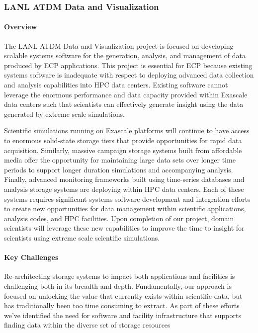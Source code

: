 \subsubsection{ LANL ATDM Data and Visualization} 

\paragraph{Overview} 
The LANL ATDM Data and Visualization project is focused on developing scalable
systems software for the generation, analysis, and management of data
produced by ECP applications. This project is essential for ECP because
existing systems software is inadequate with respect to deploying advanced
data collection and analysis capabilities into HPC data centers. Existing
software cannot leverage the enormous performance and data capacity
provided within Exascale data centers such that scientists can effectively
generate insight using the data generated by extreme scale
simulations.

Scientific simulations running on Exascale platforms will
continue to have access to enormous solid-state storage tiers that provide 
opportunities for rapid data acquisition. Similarly, massive campaign storage
systems built from affordable media offer the opportunity for maintaining
large data sets over longer time periods to support longer duration
simulations and accompanying analysis. Finally, advanced monitoring frameworks
built using time-series databases and analysis storage systems are deploying
within HPC data centers. Each of these systems requires significant systems
software development and integration efforts to create new opportunities for data
management within scientific applications, analysis codes, and HPC
facilities. Upon completion of our project, domain scientists will
leverage these new capabilities to improve the
time to insight for scientists using extreme scale scientific simulations.

\paragraph{Key  Challenges}
Re-architecting storage systems to impact both applications and facilities is
challenging both in its breadth and depth. Fundamentally, our approach is
focused on unlocking the value that currently exists within scientific data,
but has traditionally been too time consuming to extract. As part of these
efforts we've identified the need for software and facility infrastructure
that supports finding data within the diverse set of storage resources

